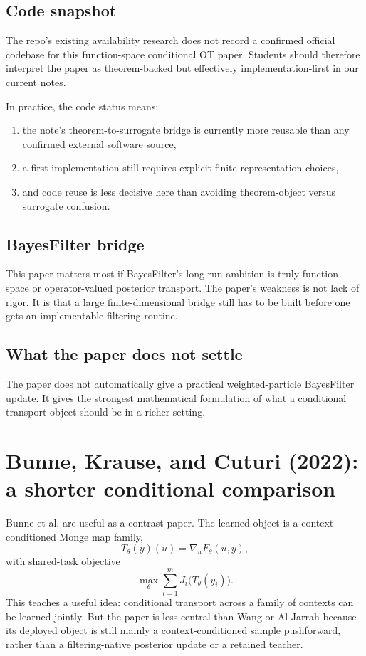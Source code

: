 \documentclass[11pt]{report}
\begin{document}
\subsection*{Code snapshot}

The repo's existing availability research does not record a confirmed official
codebase for this function-space conditional OT paper.  Students should therefore
interpret the paper as theorem-backed but effectively implementation-first in our
current notes.

In practice, the code status means:
\begin{enumerate}[label=(\roman*)]
  \item the note's theorem-to-surrogate bridge is currently more reusable than any confirmed external software source,
  \item a first implementation still requires explicit finite representation choices,
  \item and code reuse is less decisive here than avoiding theorem-object versus surrogate confusion.
\end{enumerate}

\subsection*{BayesFilter bridge}

This paper matters most if BayesFilter's long-run ambition is truly
function-space or operator-valued posterior transport.  The paper's weakness is not
lack of rigor.  It is that a large finite-dimensional bridge still has to be built
before one gets an implementable filtering routine.

\subsection*{What the paper does not settle}

The paper does not automatically give a practical weighted-particle BayesFilter
update.  It gives the strongest mathematical formulation of what a conditional
transport object should be in a richer setting.


\section{Bunne, Krause, and Cuturi (2022): a shorter conditional comparison}

Bunne et al. are useful as a contrast paper.  The learned object is a
context-conditioned Monge map family,
\begin{equation}
T_\theta(y)(u)=\nabla_u F_\theta(u,y),
\label{eq:bunne-conditional-map}
\end{equation}
with shared-task objective
\begin{equation}
\max_\theta \sum_{i=1}^{m} J_i\bigl(T_\theta(y_i)\bigr).
\label{eq:bunne-task-aggregate}
\end{equation}
This teaches a useful idea: conditional transport across a family of contexts can
be learned jointly.  But the paper is less central than Wang or Al-Jarrah because
its deployed object is still mainly a context-conditioned sample pushforward,
rather than a filtering-native posterior update or a retained teacher.
\end{document}
